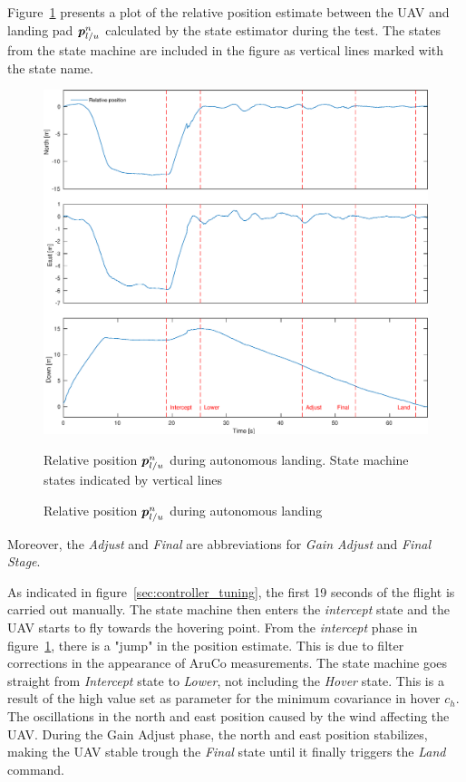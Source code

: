 Figure~\ref{fig:controller_tuning} presents a plot of the relative position estimate between the \gls{UAV} and landing pad $\boldsymbol{p}^{n}_{l/u}$ calculated by the state estimator during the test. The states from the state machine are included in the figure as vertical lines marked with the state name.
\begin{figure}[h!]
	\centering
	\includegraphics[width=.9\linewidth]{img/plot/static/controller.eps}
	\caption{Relative position $\boldsymbol{p}^{n}_{l/u}$ during autonomous landing}{Relative position $\boldsymbol{p}^{n}_{l/u}$ during autonomous landing. State machine states indicated by vertical lines}
	\label{fig:controller_tuning}
\end{figure}
Moreover, the \textit{Adjust} and \textit{Final} are abbreviations for \textit{Gain Adjust} and \textit{Final Stage}.

As indicated in figure~\ref{sec:controller_tuning}, the first 19 seconds of the flight is carried out manually. The state machine then enters the \textit{intercept} state and the UAV starts to fly towards the hovering point. From the \textit{intercept} phase in figure~\ref{fig:controller_tuning}, there is a "jump" in the position estimate. This is due to filter corrections in the appearance of AruCo measurements. The state machine goes straight from \textit{Intercept} state to \textit{Lower}, not including the \textit{Hover} state. This is a result of the high value set as parameter for the minimum covariance in hover $c_h$. The oscillations in the north and east position caused by the wind affecting the \gls{UAV}. During the Gain Adjust phase, the north and east position stabilizes, making the UAV stable trough the \textit{Final} state until it finally triggers the \textit{Land} command.


